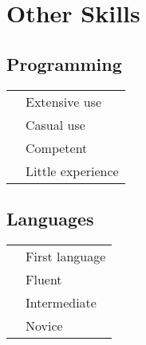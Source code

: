 \documentclass[]{friggeri-cv}
\newcommand{\cvSkillsTwoCols}[2]{
  \begin{minipage}[t]{.5\textwidth}#1\end{minipage}
  \hfill
  \begin{minipage}[t]{.4\textwidth}#2\end{minipage}
}
\begin{document}
\section{Other Skills}
\cvSkillsTwoCols{
\subsection{Programming}
\vspace{5pt}
\begin{tabular}{rl}
     {\thinfont\color{headercolor}{MATLAB}} & {Extensive use}\\
     {\thinfont\color{headercolor}{Ruby}} & {Casual use}\\
     {\thinfont\color{headercolor}{java, C++}} & {Competent}\\
     {\thinfont\color{headercolor}{Python}} & {Little experience}\\
\end{tabular}
}{
\subsection{Languages}
\vspace{5pt}
\begin{tabular}{rl}
     {\thinfont\color{headercolor}{French}} & {First language}  \\
     {\thinfont\color{headercolor}{English}} & {Fluent}\\
     {\thinfont\color{headercolor}{Italian}} & {Intermediate}  \\
     {\thinfont\color{headercolor}{Japanese}} & {Novice}\\
\end{tabular}
}


\vspace{5pt}
\end{document}
